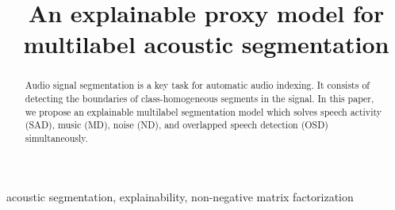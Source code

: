 \documentclass{article}
\title{An explainable proxy model for multilabel acoustic segmentation}
\begin{document}
\ninept

\maketitle
%
\begin{abstract}
Audio signal segmentation is a key task for automatic audio indexing. 
It consists of detecting the boundaries of class-homogeneous segments in the signal.
In this paper, we propose an explainable multilabel segmentation model which solves speech activity (SAD), music (MD), noise (ND), and overlapped speech detection (OSD) simultaneously.
\end{abstract}
%
\begin{keywords}
acoustic segmentation, explainability, non-negative matrix factorization
\end{keywords}
%







\newpage


%
\end{document}
